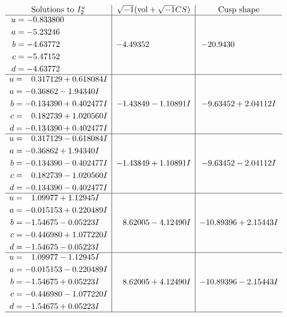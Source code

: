 \documentclass[1p]{elsarticle_modified}
\theoremstyle{definition}
\newcommand{\I}{\sqrt{-1}}
\begin{document}
$$\begin{array}{c|c|c}  
\text{Solutions to }I^u_{2}& \I (\text{vol} + \sqrt{-1}CS) & \text{Cusp shape}\\
 \hline 
\begin{aligned}
u &= -0.833800\phantom{ +0.000000I} \\
a &= -5.23246\phantom{ +0.000000I} \\
b &= -4.63772\phantom{ +0.000000I} \\
c &= -5.47152\phantom{ +0.000000I} \\
d &= -4.63772\phantom{ +0.000000I}\end{aligned}
 & -4.49352\phantom{ +0.000000I} & -20.9430\phantom{ +0.000000I} \\ \hline\begin{aligned}
u &= \phantom{-}0.317129 + 0.618084 I \\
a &= -0.36862 - 1.94340 I \\
b &= -0.134390 + 0.402477 I \\
c &= \phantom{-}0.182739 + 1.020560 I \\
d &= -0.134390 + 0.402477 I\end{aligned}
 & -1.43849 - 1.10891 I & -9.63452 + 2.04112 I \\ \hline\begin{aligned}
u &= \phantom{-}0.317129 - 0.618084 I \\
a &= -0.36862 + 1.94340 I \\
b &= -0.134390 - 0.402477 I \\
c &= \phantom{-}0.182739 - 1.020560 I \\
d &= -0.134390 - 0.402477 I\end{aligned}
 & -1.43849 + 1.10891 I & -9.63452 - 2.04112 I \\ \hline\begin{aligned}
u &= \phantom{-}1.09977 + 1.12945 I \\
a &= -0.015153 + 0.220489 I \\
b &= -1.54675 - 0.05223 I \\
c &= -0.446980 + 1.077220 I \\
d &= -1.54675 - 0.05223 I\end{aligned}
 & \phantom{-}8.62005 - 4.12490 I & -10.89396 + 2.15443 I \\ \hline\begin{aligned}
u &= \phantom{-}1.09977 - 1.12945 I \\
a &= -0.015153 - 0.220489 I \\
b &= -1.54675 + 0.05223 I \\
c &= -0.446980 - 1.077220 I \\
d &= -1.54675 + 0.05223 I\end{aligned}
 & \phantom{-}8.62005 + 4.12490 I & -10.89396 - 2.15443 I\\
 \hline 
 \end{array}$$\newpage\newpage\renewcommand{\arraystretch}{1}
\end{document}
